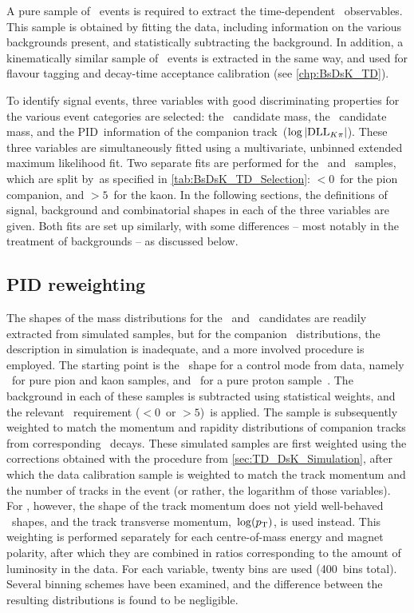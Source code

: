 A pure sample of \BsDsK~events is required to extract the time-dependent \CP~observables.
This sample is obtained by fitting the data, including information on the various backgrounds present, and statistically subtracting the background.
In addition, a kinematically similar sample of \BsDsPi~events is extracted in the same way, and used for flavour tagging and decay-time acceptance calibration (see \cref{chp:BsDsK_TD}).

To identify signal events, three variables with good discriminating properties for the various event categories are selected: the \Bs~candidate mass, the \Dsmp~candidate mass, and the PID~information of the companion track~(\({\log|\text{DLL}_{{K}{\pi}}|}\)).
These three variables are simultaneously fitted using a multivariate, unbinned extended maximum likelihood fit.
Two separate fits are performed for the \BsDsPi~and \BsDsK~samples, which are split by~\dllkpi as specified in \cref{tab:BsDsK_TD_Selection}: \({< \num{0}}\)~for the pion companion, and \({> \num{5}}\)~for the kaon.
In the following sections, the definitions of signal, background and combinatorial shapes in each of the three variables are given.
Both fits are set up similarly, with some differences -- most notably in the treatment of backgrounds -- as discussed below.

\subsection{PID reweighting} \label{sec:BsDsK_TD_MD_PID_Reweighting}

The shapes of the mass distributions for the \Bs~and \Dsmp~candidates are readily extracted from simulated samples, but for the companion \dllkpi~distributions, the description in simulation is inadequate, and a more involved procedure is employed.
The starting point is the \dllkpi~shape for a control mode from data, namely \DstarDPi~for pure pion and kaon samples, and \Lzppi~for a pure proton sample~\cite{Powell:1322666}.
The background in each of these samples is subtracted using statistical weights, and the relevant \dllkpi~requirement (\({< \num{0}}\)~or \({> \num{5}}\))~is applied.
The sample is subsequently weighted to match the momentum and rapidity distributions of companion tracks from corresponding \Bs~decays.
These simulated samples are first weighted using the corrections obtained with the procedure from \cref{sec:TD_DsK_Simulation}, after which the data calibration sample is weighted to match the track momentum and the number of tracks in the event (or rather, the logarithm of those variables).
For \BsDsK, however, the shape of the track momentum does not yield well-behaved \dllkpi~shapes, and the track transverse momentum,~\({\log(\mbox{\ensuremath{p_{\text{T}}}})}\), is used instead.
This weighting is performed separately for each centre-of-mass energy and magnet polarity, after which they are combined in ratios corresponding to the amount of luminosity in the data.
For each variable, twenty bins are used (\num{400}~bins total).
Several binning schemes have been examined, and the difference between the resulting distributions is found to be negligible.


